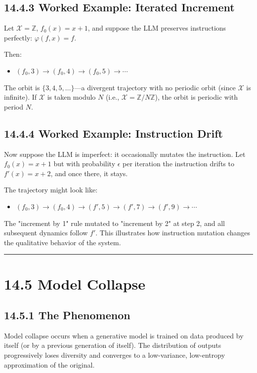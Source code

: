 \subsection{14.4.3 Worked Example: Iterated Increment}

Let $\mathcal{X} = \mathbb{Z}$, $f_0(x) = x + 1$, and suppose the LLM preserves instructions perfectly: $\varphi(f, x) = f$.

Then:
\begin{itemize}
  \item $(f_0, 3) \to (f_0, 4) \to (f_0, 5) \to \cdots$
\end{itemize}

The orbit is $\{ 3, 4, 5, \ldots\} $---a divergent trajectory with no periodic orbit (since $\mathcal{X}$ is infinite). If $\mathcal{X}$ is taken modulo $N$ (i.e., $\mathcal{X} = \mathbb{Z}/N\mathbb{Z}$), the orbit is periodic with period $N$.

\subsection{14.4.4 Worked Example: Instruction Drift}

Now suppose the LLM is imperfect: it occasionally mutates the instruction. Let $f_0(x) = x + 1$ but with probability $\epsilon$ per iteration the instruction drifts to $f'(x) = x + 2$, and once there, it stays.

The trajectory might look like:
\begin{itemize}
  \item $(f_0, 3) \to (f_0, 4) \to (f', 5) \to (f', 7) \to (f', 9) \to \cdots$
\end{itemize}

The "increment by 1" rule mutated to "increment by 2" at step 2, and all subsequent dynamics follow $f'$. This illustrates how instruction mutation changes the qualitative behavior of the system.

\bigskip\hrule\bigskip

\section{14.5 Model Collapse}

\subsection{14.5.1 The Phenomenon}

Model collapse occurs when a generative model is trained on data produced by itself (or by a previous generation of itself). The distribution of outputs progressively loses diversity and converges to a low-variance, low-entropy approximation of the original.

